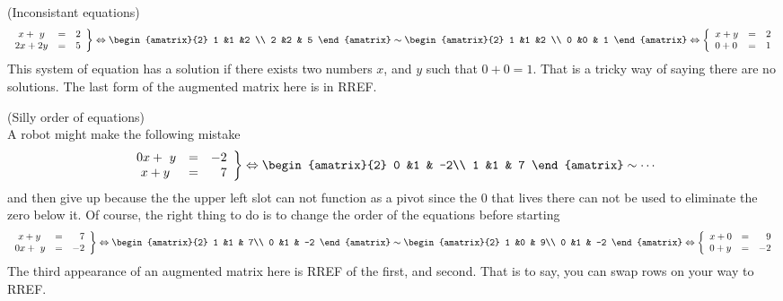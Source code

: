 \begin{example} (Inconsistant equations)
\[
   \left.
\begin{array}{lcr}
	\ x + \ y & = & 2 \\
	2x + 2y & = &  5
     \end{array}
   \right\} 
   \Leftrightarrow
\begin{amatrix}{2}
1 &1 &2 \\ 2 &2 & 5
\end{amatrix}
\sim
\begin{amatrix}{2}
1 &1 &2 \\ 0 &0 & 1
\end{amatrix}
\Leftrightarrow
\left\{
\begin{array}{lcr}
	x + y & = & 2 \\
	 0 + 0 & = &  1
     \end{array}
   \right.
\]
This system of equation has a solution if there exists two numbers $x$, and $y$ such that $0+0=1$. That is a tricky way of saying there are no solutions. The last form of the augmented matrix here is in RREF.
\end{example}


\begin{example} (Silly order of equations)\\
A robot might make the following mistake
\[
   \left.
\begin{array}{lcr}
	0x +  \ y & = & -2 \\
	\ x + y & = &  7
     \end{array}
   \right\} 
   \Leftrightarrow 
\begin{amatrix}{2}
0 &1 & -2\\ 1 &1 & 7
\end{amatrix}
\sim \cdots
\]
and then give up because the the upper left slot can not function as a pivot since the 0 that lives there can not be used to eliminate the zero below it. Of course, the right thing to do is to change the order of the equations before starting
\[
   \left.
\begin{array}{lcr}
	\ x + y & = &  7
	\\
	0x +  \ y & = & -2 
	     \end{array}
   \right\} 
   \Leftrightarrow
\begin{amatrix}{2}
1 &1 & 7\\ 0 &1 & -2
\end{amatrix}
\sim 
\begin{amatrix}{2}
1 &0 & 9\\ 0 &1 & -2
\end{amatrix}
\Leftrightarrow
\left\{
\begin{array}{lcr}
	x + 0 & = & 9 \\
	 0 + y & = & -2
     \end{array}
   \right.
\]
The third appearance of an augmented matrix here is RREF of the first, and second. That is to say, you can swap rows on your way to RREF.
\end{example}



